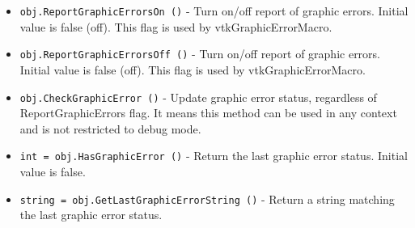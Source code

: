 \begin{itemize}
\item  \verb|obj.ReportGraphicErrorsOn ()| -  Turn on/off report of graphic errors. Initial value is false (off).
 This flag is used by vtkGraphicErrorMacro.

\item  \verb|obj.ReportGraphicErrorsOff ()| -  Turn on/off report of graphic errors. Initial value is false (off).
 This flag is used by vtkGraphicErrorMacro.

\item  \verb|obj.CheckGraphicError ()| -  Update graphic error status, regardless of ReportGraphicErrors flag.
 It means this method can be used in any context and is not restricted to
 debug mode.

\item  \verb|int = obj.HasGraphicError ()| -  Return the last graphic error status. Initial value is false.

\item  \verb|string = obj.GetLastGraphicErrorString ()| -  Return a string matching the last graphic error status.

\end{itemize}
